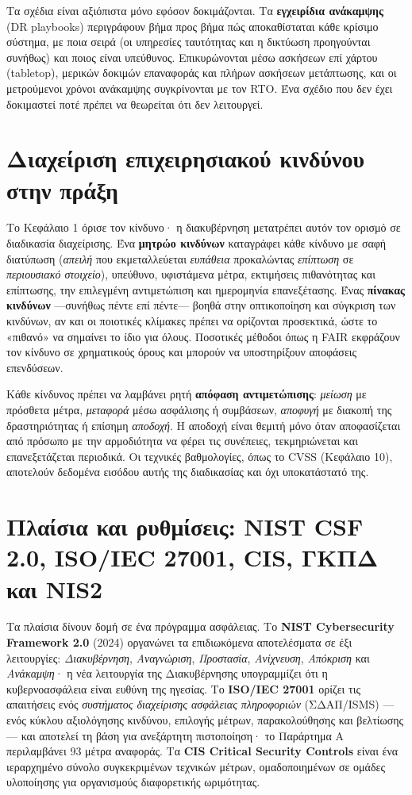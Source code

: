 Τα σχέδια είναι αξιόπιστα μόνο εφόσον δοκιμάζονται. Τα \textbf{εγχειρίδια ανάκαμψης} (DR playbooks) περιγράφουν βήμα προς βήμα πώς αποκαθίσταται κάθε κρίσιμο σύστημα, με ποια σειρά (οι υπηρεσίες ταυτότητας και η δικτύωση προηγούνται συνήθως) και ποιος είναι υπεύθυνος. Επικυρώνονται μέσω ασκήσεων επί χάρτου (tabletop), μερικών δοκιμών επαναφοράς και πλήρων ασκήσεων μετάπτωσης, και οι μετρούμενοι χρόνοι ανάκαμψης συγκρίνονται με τον RTO. Ένα σχέδιο που δεν έχει δοκιμαστεί ποτέ πρέπει να θεωρείται ότι δεν λειτουργεί.

\section{Διαχείριση επιχειρησιακού κινδύνου στην πράξη}\label{sec:13.3}
Το Κεφάλαιο 1 όρισε τον κίνδυνο· η διακυβέρνηση μετατρέπει αυτόν τον ορισμό σε διαδικασία διαχείρισης. Ένα \textbf{μητρώο κινδύνων} καταγράφει κάθε κίνδυνο με σαφή διατύπωση (\emph{απειλή} που εκμεταλλεύεται \emph{ευπάθεια} προκαλώντας \emph{επίπτωση} σε \emph{περιουσιακό στοιχείο}), υπεύθυνο, υφιστάμενα μέτρα, εκτιμήσεις πιθανότητας και επίπτωσης, την επιλεγμένη αντιμετώπιση και ημερομηνία επανεξέτασης. Ένας \textbf{πίνακας κινδύνων} —συνήθως πέντε επί πέντε— βοηθά στην οπτικοποίηση και σύγκριση των κινδύνων, αν και οι ποιοτικές κλίμακες πρέπει να ορίζονται προσεκτικά, ώστε το «πιθανό» να σημαίνει το ίδιο για όλους. Ποσοτικές μέθοδοι όπως η FAIR εκφράζουν τον κίνδυνο σε χρηματικούς όρους και μπορούν να υποστηρίξουν αποφάσεις επενδύσεων.

Κάθε κίνδυνος πρέπει να λαμβάνει ρητή \textbf{απόφαση αντιμετώπισης}: \emph{μείωση} με πρόσθετα μέτρα, \emph{μεταφορά} μέσω ασφάλισης ή συμβάσεων, \emph{αποφυγή} με διακοπή της δραστηριότητας ή επίσημη \emph{αποδοχή}. Η αποδοχή είναι θεμιτή μόνο όταν αποφασίζεται από πρόσωπο με την αρμοδιότητα να φέρει τις συνέπειες, τεκμηριώνεται και επανεξετάζεται περιοδικά. Οι τεχνικές βαθμολογίες, όπως το CVSS (Κεφάλαιο 10), αποτελούν δεδομένα εισόδου αυτής της διαδικασίας και όχι υποκατάστατό της.

\section{Πλαίσια και ρυθμίσεις: NIST CSF 2.0, ISO/IEC 27001, CIS, ΓΚΠΔ και NIS2}\label{sec:13.4}
Τα πλαίσια δίνουν δομή σε ένα πρόγραμμα ασφάλειας. Το \textbf{NIST Cybersecurity Framework 2.0} (2024) οργανώνει τα επιδιωκόμενα αποτελέσματα σε έξι λειτουργίες: \emph{Διακυβέρνηση}, \emph{Αναγνώριση}, \emph{Προστασία}, \emph{Ανίχνευση}, \emph{Απόκριση} και \emph{Ανάκαμψη}· η νέα λειτουργία της Διακυβέρνησης υπογραμμίζει ότι η κυβερνοασφάλεια είναι ευθύνη της ηγεσίας. Το \textbf{ISO/IEC 27001} ορίζει τις απαιτήσεις ενός \emph{συστήματος διαχείρισης ασφάλειας πληροφοριών} (ΣΔΑΠ/ISMS) —ενός κύκλου αξιολόγησης κινδύνου, επιλογής μέτρων, παρακολούθησης και βελτίωσης— και αποτελεί τη βάση για ανεξάρτητη πιστοποίηση· το Παράρτημα Α περιλαμβάνει 93 μέτρα αναφοράς. Τα \textbf{CIS Critical Security Controls} είναι ένα ιεραρχημένο σύνολο συγκεκριμένων τεχνικών μέτρων, ομαδοποιημένων σε ομάδες υλοποίησης για οργανισμούς διαφορετικής ωριμότητας.

